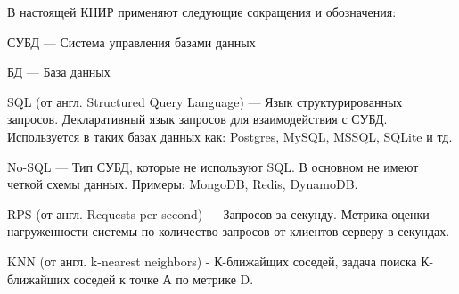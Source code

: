 \Abbreviations %
В настоящей КНИР применяют следующие сокращения и обозначения:

\noindent СУБД --- Система управления базами данных

\noindent БД --- База данных

\noindent SQL (от англ. Structured Query Language) --- Язык структурированных запросов. Декларативный язык запросов для взаимодействия с СУБД. Используется в таких базах данных как: Postgres, MySQL, MSSQL, SQLite и тд.

\noindent No-SQL --- Тип СУБД, которые не используют SQL. В основном не имеют четкой схемы данных. Примеры: MongoDB, Redis, DynamoDB.

\noindent RPS (от англ. Requests per second) --- Запросов за секунду. Метрика оценки нагруженности системы по количество запросов от клиентов серверу в секундах.

\noindent KNN (от англ. k-nearest neighbors) - К-ближайщих соседей, задача поиска К-ближайших соседей к точке А по метрике D.

